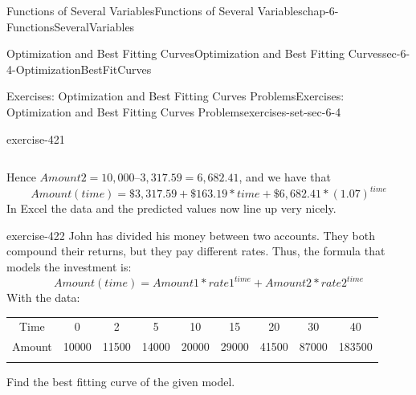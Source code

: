 \documentclass[oneside,10pt,]{book}
\numberwithin{equation}{section}
\newcommand{\hrulethin}  {\noalign{\hrule height 0.04em}}
\newcommand{\hrulethick} {\noalign{\hrule height 0.11em}}
\begin{document}
\begin{chapterptx}{Functions of Several Variables}{}{Functions of Several Variables}{}{}{chap-6-FunctionsSeveralVariables}
\begin{sectionptx}{Optimization and Best Fitting Curves}{}{Optimization and Best Fitting Curves}{}{}{sec-6-4-OptimizationBestFitCurves}
\begin{exercises-subsection-numberless}{Exercises: Optimization and Best Fitting Curves Problems}{}{Exercises: Optimization and Best Fitting Curves Problems}{}{}{exercises-set-sec-6-4}
\begin{divisionexercise}{7}{}{}{exercise-421}
\begin{sidebyside}{1}{0}{0}{0}
\begin{sbspanel}{1}
{\begin{tabular}{cc}
\end{tabular}
\par}
\end{sbspanel}%
\end{sidebyside}%
\par
\hypertarget{p-2529}{}%
Hence \(Amount 2 = 10,000 – 3,317.59 = 6,682.41\), and we have that%
%
\begin{equation*}
Amount(time)=\$3,317.59+\$163.19*time+\$6,682.41* (1.07)^{time}
\end{equation*}
\hypertarget{p-2530}{}%
In Excel the data and the predicted values now line up very nicely.%
\end{divisionexercise}%
\begin{divisionexercise}{8}{}{}{exercise-422}%
\hypertarget{p-2531}{}%
John has divided his money between two accounts.  They both compound their returns, but they pay different rates.  Thus, the formula that models the investment is:%
%
\begin{equation*}
Amount(time)=Amount1*rate1^{time}+Amount2*rate2^{time}
\end{equation*}
\hypertarget{p-2532}{}%
With the data:%
\begin{sidebyside}{1}{0}{0}{0}%
\begin{sbspanel}{1}%
{\centering%
\begin{tabular}{ccccccccc}\hrulethick
Time&0&2&5&10&15&20&30&40\tabularnewline\hrulethin
Amount&\textdollar{}10000&\textdollar{}11500&\textdollar{}14000&\textdollar{}20000&\textdollar{}29000&\textdollar{}41500&\textdollar{}87000&\textdollar{}183500\tabularnewline\hrulethin
\end{tabular}
\par}
\end{sbspanel}%
\end{sidebyside}%
\par
\hypertarget{p-2533}{}%
Find the best fitting curve of the given model.%
\end{divisionexercise}%
\end{exercises-subsection-numberless}
\end{sectionptx}
\end{chapterptx}
%
%
\typeout{************************************************}
\typeout{************************************************}
%
\end{document}
